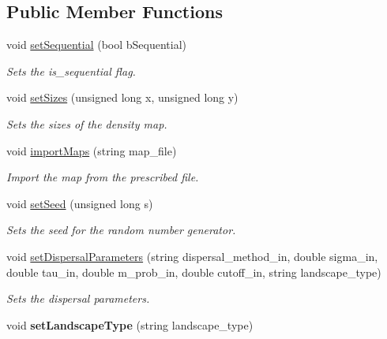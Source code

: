 \subsection*{Public Member Functions}
\begin{DoxyCompactItemize}
\item 
void \hyperlink{class_simulate_dispersal_a3da09319132db8c7ad035290be6590ef}{set\+Sequential} (bool b\+Sequential)
\begin{DoxyCompactList}\small\item\em Sets the is\+\_\+sequential flag. \end{DoxyCompactList}\item 
void \hyperlink{class_simulate_dispersal_ade30de5c9c7daebb6ccc4168fec3e813}{set\+Sizes} (unsigned long x, unsigned long y)
\begin{DoxyCompactList}\small\item\em Sets the sizes of the density map. \end{DoxyCompactList}\item 
void \hyperlink{class_simulate_dispersal_a8c7c65b4788010f02213fba5c985f49a}{import\+Maps} (string map\+\_\+file)
\begin{DoxyCompactList}\small\item\em Import the map from the prescribed file. \end{DoxyCompactList}\item 
void \hyperlink{class_simulate_dispersal_a46f2cd557ac9b21c107eac75e7c916af}{set\+Seed} (unsigned long s)
\begin{DoxyCompactList}\small\item\em Sets the seed for the random number generator. \end{DoxyCompactList}\item 
void \hyperlink{class_simulate_dispersal_a93b3d450679b00c015f5e18d91f3a426}{set\+Dispersal\+Parameters} (string dispersal\+\_\+method\+\_\+in, double sigma\+\_\+in, double tau\+\_\+in, double m\+\_\+prob\+\_\+in, double cutoff\+\_\+in, string landscape\+\_\+type)
\begin{DoxyCompactList}\small\item\em Sets the dispersal parameters. \end{DoxyCompactList}\item 
void {\bfseries set\+Landscape\+Type} (string landscape\+\_\+type)\hypertarget{class_simulate_dispersal_a627bcb0be7e7d6b0ef1dbd44b32a1909}{}\label{class_simulate_dispersal_a627bcb0be7e7d6b0ef1dbd44b32a1909}


\end{DoxyCompactItemize}
